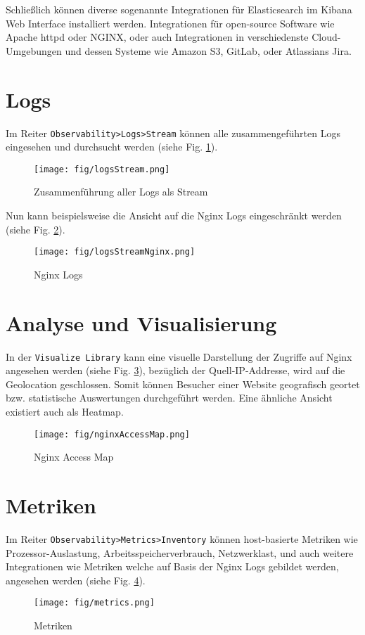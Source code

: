 Schließlich können diverse sogenannte Integrationen \cite{elasticIntegrationsWebsite}
für Elasticsearch im Kibana Web Interface installiert werden.
Integrationen für open-source Software wie Apache httpd oder NGINX,
oder auch Integrationen in verschiedenste Cloud-Umgebungen und dessen
Systeme wie Amazon S3, GitLab, oder Atlassians Jira.

\section{Logs}
Im Reiter \verb|Observability>Logs>Stream| können alle zusammengeführten
Logs eingesehen und durchsucht werden (siehe Fig. \ref{fig:logsStream}).

\begin{figure}[h]
	\centering
	\texttt{[image: fig/logsStream.png]}
	\caption{Zusammenführung aller Logs als Stream}
	\label{fig:logsStream}	
\end{figure}

Nun kann beispielsweise die Ansicht auf die Nginx Logs eingeschränkt werden
(siehe Fig. \ref{fig:logsStreamNginx}).

\begin{figure}[h]
	\centering
	\texttt{[image: fig/logsStreamNginx.png]}
	\caption{Nginx Logs}
	\label{fig:logsStreamNginx}	
\end{figure}

\section{Analyse und Visualisierung}
In der \verb|Visualize Library| kann eine visuelle Darstellung
der Zugriffe auf Nginx angesehen werden (siehe Fig. \ref{fig:nginxAccessMap}), 
bezüglich der Quell-IP-Addresse,
wird auf die Geolocation geschlossen. Somit können Besucher einer Website
geografisch geortet bzw. statistische Auswertungen durchgeführt werden.
Eine ähnliche Ansicht existiert auch als Heatmap.

\begin{figure}[h]
	\centering
	\texttt{[image: fig/nginxAccessMap.png]}
	\caption{Nginx Access Map}
	\label{fig:nginxAccessMap}	
\end{figure}

\section{Metriken}
Im Reiter \verb|Observability>Metrics>Inventory| können host-basierte
Metriken wie Prozessor-Auslastung, Arbeitsspeicherverbrauch,
Netzwerklast, und auch weitere Integrationen wie Metriken
welche auf Basis der Nginx Logs gebildet werden, angesehen werden
(siehe Fig. \ref{fig:metrics}).

\begin{figure}[h]
	\centering
	\texttt{[image: fig/metrics.png]}
	\caption{Metriken}
	\label{fig:metrics}	
\end{figure}



